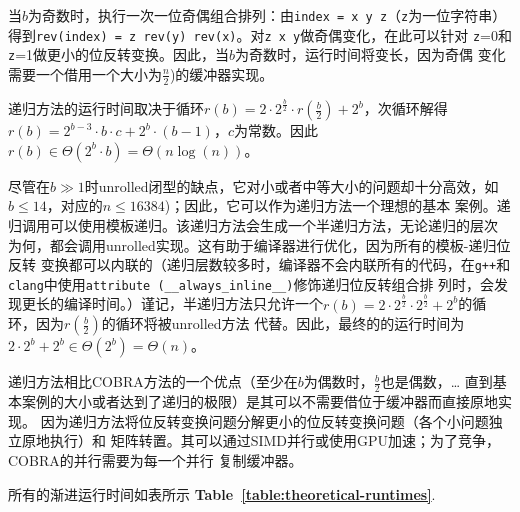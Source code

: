 \documentclass[10pt]{article}
\begin{document}
\begin{CJK*}{UTF8}{gbsn}
当$b$为奇数时，执行一次一位奇偶组合排列：由{\tt index = x y z}（{\tt z}为一位字符串）
得到{\tt rev(index) = z~rev(y)~rev(x)}。对{\tt z x y}做奇偶变化，在此可以针对
{\tt z}=0和{\tt z}=1做更小的位反转变换。因此，当$b$为奇数时，运行时间将变长，因为奇偶
变化需要一个借用一个大小为$\frac{n}{2}$)的缓冲器实现。

递归方法的运行时间取决于循环$r(b)
= 2 \cdot 2^{\frac{b}{2}} \cdot r(\frac{b}{2}) + 2^b$，次循环解得$r(b) = 2^{b-3} \cdot b \cdot c + 2^b \cdot (b-1)$，$c$为常数。因此$r(b) \in \Theta(2^b \cdot b) = \Theta(n\log(n))$。

尽管在$b \gg 1$时unrolled闭型的缺点，它对小或者中等大小的问题却十分高效，如
$b \leq 14$，对应的$n \leq 16384$)；因此，它可以作为递归方法一个理想的基本
案例。递归调用可以使用模板递归。该递归方法会生成一个半递归方法，无论递归的层次
为何，都会调用unrolled实现。这有助于编译器进行优化，因为所有的模板-递归位反转
变换都可以内联的（递归层数较多时，编译器不会内联所有的代码，在{\tt g++}和{\tt
clang}中使用{\tt attribute~(\_\_always\_inline\_\_)}修饰递归位反转组合排
列时，会发现更长的编译时间。）谨记，半递归方法只允许一个$r(b) = 2 \cdot 2^{\frac{b}{2}}
\cdot 2^{\frac{b}{2}} + 2^b$的循环，因为$r(\frac{b}{2})$的循环将被unrolled方法
代替。因此，最终的的运行时间为$2\cdot 2^b + 2^b \in \Theta(2^b) = \Theta(n)$。

递归方法相比COBRA方法的一个优点（至少在$b$为偶数时，$\frac{b}{2}$也是偶数，\ldots
直到基本案例的大小或者达到了递归的极限）是其可以不需要借位于缓冲器而直接原地实现。
因为递归方法将位反转变换问题分解更小的位反转变换问题（各个小问题独立原地执行）和
矩阵转置。其可以通过SIMD并行或使用GPU加速；为了竞争，COBRA的并行需要为每一个并行
复制缓冲器。\newline

所有的渐进运行时间如表所示 {\bf
  Table~\ref{table:theoretical-runtimes}}.


\end{CJK*}
\end{document}
